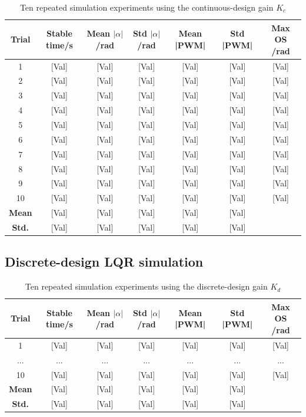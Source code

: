 \documentclass[12pt,a4paper]{article}
\begin{document}
\begin{table}[h!]
    \centering
    \caption{Ten repeated simulation experiments using the continuous-design gain $K_c$}
    \begin{tabular}{ccccccc}
        \toprule
        \textbf{Trial} & \textbf{Stable time/s} & \textbf{Mean $|\alpha|$ /rad} & \textbf{Std $|\alpha|$ /rad} & \textbf{Mean |PWM|} & \textbf{Std |PWM|} & \textbf{Max OS /rad} \\
        \midrule
        1 & [Val] & [Val] & [Val] & [Val] & [Val] & [Val] \\
        2 & [Val] & [Val] & [Val] & [Val] & [Val] & [Val] \\
        3 & [Val] & [Val] & [Val] & [Val] & [Val] & [Val] \\
        4 & [Val] & [Val] & [Val] & [Val] & [Val] & [Val] \\
        5 & [Val] & [Val] & [Val] & [Val] & [Val] & [Val] \\
        6 & [Val] & [Val] & [Val] & [Val] & [Val] & [Val] \\
        7 & [Val] & [Val] & [Val] & [Val] & [Val] & [Val] \\
        8 & [Val] & [Val] & [Val] & [Val] & [Val] & [Val] \\
        9 & [Val] & [Val] & [Val] & [Val] & [Val] & [Val] \\
        10 & [Val] & [Val] & [Val] & [Val] & [Val] & [Val] \\
        \midrule
        \textbf{Mean} & [Val] & [Val] & [Val] & [Val] & [Val] & \\
        \textbf{Std.} & [Val] & [Val] & [Val] & [Val] & [Val] & \\
        \bottomrule
    \end{tabular}
\end{table}

\subsection{Discrete-design LQR simulation}

\begin{table}[h!]
    \centering
    \caption{Ten repeated simulation experiments using the discrete-design gain $K_d$}
    \begin{tabular}{ccccccc}
        \toprule
        \textbf{Trial} & \textbf{Stable time/s} & \textbf{Mean $|\alpha|$ /rad} & \textbf{Std $|\alpha|$ /rad} & \textbf{Mean |PWM|} & \textbf{Std |PWM|} & \textbf{Max OS /rad} \\
        \midrule
        1 & [Val] & [Val] & [Val] & [Val] & [Val] & [Val] \\
        ... & ... & ... & ... & ... & ... & ... \\
        10 & [Val] & [Val] & [Val] & [Val] & [Val] & [Val] \\
        \midrule
        \textbf{Mean} & [Val] & [Val] & [Val] & [Val] & [Val] & \\
        \textbf{Std.} & [Val] & [Val] & [Val] & [Val] & [Val] & \\
        \bottomrule
    \end{tabular}
\end{table}
\end{document}
